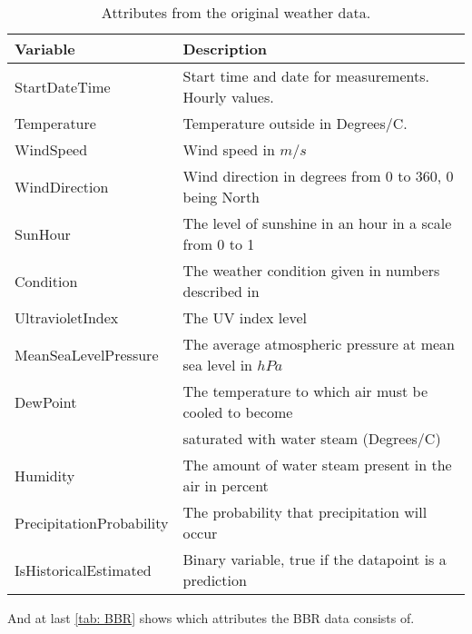 \begin{table}[H]
    \centering
    \begin{tabular}{ll}
     \hline
     \textbf{Variable} & \textbf{Description} \\
    \hline
    \hline
    StartDateTime  &  Start time and date for measurements. Hourly values.\\
    Temperature  &  Temperature outside in Degrees/C. \\
    WindSpeed  & Wind speed in $m/s$\\
    WindDirection  & Wind direction in degrees from 0 to 360, 0 being North \\
    SunHour  & The level of sunshine in an hour in a scale from 0 to 1 \\
    Condition  & The weather condition given in numbers described in \cite{condition} \\
    UltravioletIndex  & The UV index level \\
    MeanSeaLevelPressure  & The average atmospheric pressure at mean sea level in $hPa$ \\
    DewPoint  &  The temperature to which air must be cooled to become \\ & saturated with water steam (Degrees/C)\\
    Humidity  & The amount of water steam present in the air in percent\\
    PrecipitationProbability & The probability that precipitation will occur\\
    IsHistoricalEstimated & Binary variable, true if the datapoint is a prediction \\
    \hline
    \end{tabular}
    \caption{Attributes from the original weather data.}
    \label{tab: weatherdata}
\end{table}
\noindent And at last \cref{tab: BBR} shows which attributes the BBR data consists of.
